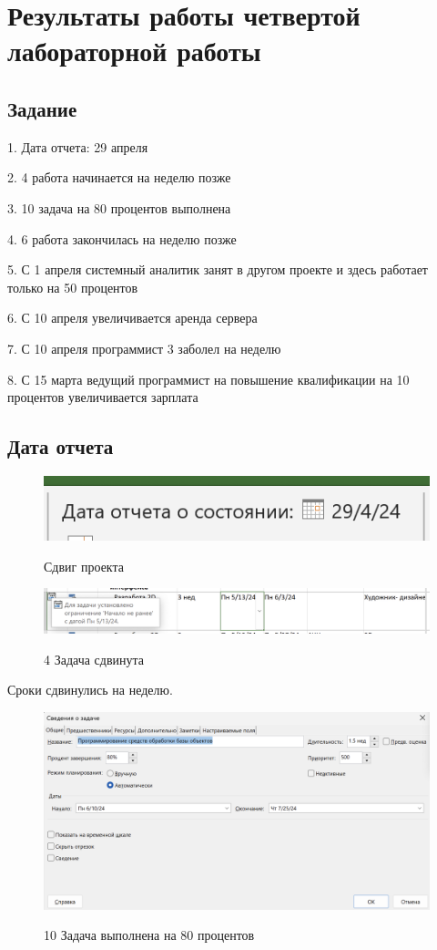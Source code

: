 \section{Результаты работы четвертой лабораторной работы}

\subsection{Задание}

1. Дата отчета: 29 апреля

2. 4 работа начинается на неделю позже

3. 10 задача на 80 процентов выполнена

4. 6 работа закончилась на неделю позже

5. С 1 апреля системный аналитик занят в другом проекте и здесь работает только на 50 процентов

6. С 10 апреля увеличивается аренда сервера

7. С 10 апреля программист 3 заболел на неделю

8. С 15 марта ведущий программист на повышение квалификации на 10 процентов увеличивается зарплата

\subsection{Дата отчета}

\begin{figure}[ht!]
	\includegraphics[width=0.75\linewidth]{assets/images/Screenshot 2024-03-09 at 11.26.27.png}
	\label{fig:r2}
	\caption{Сдвиг проекта}
\end{figure}
\FloatBarrier

\begin{figure}[ht!]
	\includegraphics[width=0.75\linewidth]{assets/images/Screenshot 2024-03-09 at 11.27.40.png}
	\label{fig:r2}
	\caption{4 Задача сдвинута}
\end{figure}
\FloatBarrier

Сроки сдвинулись на неделю.


\begin{figure}[ht!]
	\includegraphics[width=0.75\linewidth]{assets/images/Screenshot 2024-03-09 at 11.28.59.png}
	\label{fig:r2}
	\caption{10 Задача выполнена на 80 процентов}
\end{figure}
\FloatBarrier

